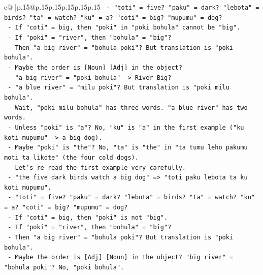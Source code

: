 \documentclass{article}
\begin{document}
{\begin{supertabular}{c@{$\;$}|p{.15\linewidth}@{}p{.15\linewidth}p{.15\linewidth}p{.15\linewidth}p{.15\linewidth}p{.15\linewidth}}
{{{\texttt{                                  {-} "toti" = five? "paku" = dark? "lebota" = birds? "ta" = watch? "ku" = a? "coti" = big? "mupumu" = dog?} \\
\texttt{                                  {-} If "coti" = big, then "poki" in "poki bohula" cannot be "big".} \\
\texttt{                                  {-} If "poki" = "river", then "bohula" = "big"?} \\
\texttt{                                  {-} Then "a big river" = "bohula poki"? But translation is "poki bohula".} \\
\texttt{                                  {-} Maybe the order is {[}Noun{]} {[}Adj{]} in the object?} \\
\texttt{                                  {-} "a big river" = "poki bohula" {-}> River Big?} \\
\texttt{                                  {-} "a blue river" = "milu poki"? But translation is "poki milu bohula".} \\
\texttt{                                  {-} Wait, "poki milu bohula" has three words. "a blue river" has two words.} \\
\texttt{                                  {-} Unless "poki" is "a"? No, "ku" is "a" in the first example ("ku koti mupumu" {-}> a big dog).} \\
\texttt{                                  {-} Maybe "poki" is "the"? No, "ta" is "the" in "ta tumu leho pakumu moti ta likote" (the four cold dogs).} \\
\texttt{                                  {-} Let's re{-}read the first example very carefully.} \\
\texttt{                                  {-} "the five dark birds watch a big dog" => "toti paku lebota ta ku koti mupumu".} \\
\texttt{                                    {-} "toti" = five? "paku" = dark? "lebota" = birds? "ta" = watch? "ku" = a? "coti" = big? "mupumu" = dog?} \\
\texttt{                                    {-} If "coti" = big, then "poki" is not "big".} \\
\texttt{                                    {-} If "poki" = "river", then "bohula" = "big"?} \\
\texttt{                                    {-} Then "a big river" = "bohula poki"? But translation is "poki bohula".} \\
\texttt{                                    {-} Maybe the order is {[}Adj{]} {[}Noun{]} in the object? "big river" = "bohula poki"? No, "poki bohula".} \\
}}}
\end{supertabular}}
\end{document}
